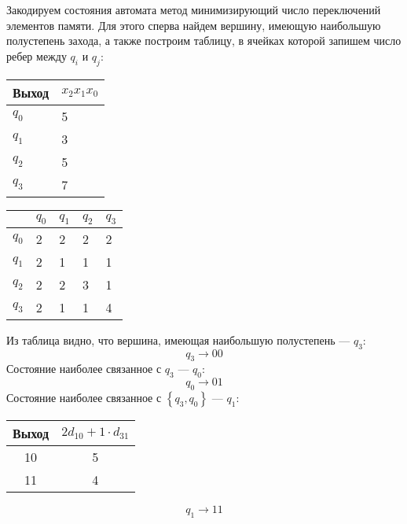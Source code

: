 Закодируем состояния автомата метод минимизирующий число переключений элементов
памяти. Для этого сперва найдем вершину, имеющую наибольшую полустепень
захода, а также построим таблицу, в ячейках которой запишем число ребер между
$q_i$ и $q_j$:
\begin{table}[H]
\centering
\begin{tabular}{|M|M|}
    \hline
    Выход & $x_2x_1x_0$ \\
    \hline
    $q_0$ & 5 \\
    \hline
    $q_1$ & 3 \\
    \hline
    $q_2$ & 5 \\
    \hline
    $q_3$ & 7 \\
    \hline
\end{tabular}
\hfill
\begin{tabular}{|M|M|M|M|M|}
    \hline
          & $q_0$ & $q_1$ & $q_2$ & $q_3$ \\
    \hline
    $q_0$ &   2   &   2   &   2   &   2   \\
    \hline
    $q_1$ &   2   &   1   &   1   &   1   \\
    \hline
    $q_2$ &   2   &   2   &   3   &   1   \\
    \hline
    $q_3$ &   2   &   1   &   1   &   4   \\
    \hline
\end{tabular}
\end{table}

Из таблица видно, что вершина, имеющая наибольшую полустепень --- $q_3$:
\[
    q_3 \to 00
\]
Состояние наиболее связанное с $q_3$ --- $q_0$:
\[
    q_0 \to 01
\]
Состояние наиболее связанное с $\left\{ q_3, q_0\right\}$ --- $q_1$:

\vspace{-1cm}%
\begin{minipage}[t]{0.48\textwidth}
    \begin{table}[H]
        \centering
        \begin{tabularx}{\textwidth}{|C|C|}
            \hline
            Выход & $2d_{10} + 1\cdot d_{31}$ \\
             & 5 \\
             & 4 \\
            \hline
        \end{tabularx}
    \end{table}
\end{minipage}
\begin{minipage}[t]{0.48\textwidth}
    \vspace{1cm}
    \[
        q_1 \to 11
    \]
\end{minipage}

